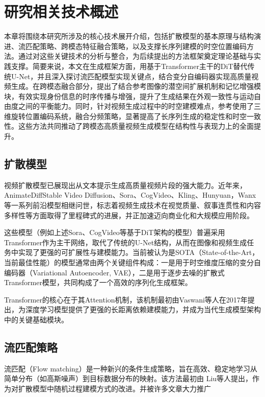 \cleardoublepage
\section{研究相关技术概述}
本章将围绕本研究所涉及的核心技术展开介绍，包括扩散模型的基本原理与结构演进、流匹配策略、跨模态特征融合策略，以及支撑长序列建模的时空位置编码方法。通过对这些关键技术的分析与整合，为后续提出的方法框架奠定理论基础与实践支撑。简要来说，本文在生成框架方面，用基于Transformer主干的DiT替代传统U-Net，并且深入探讨流匹配模型实现关键点，结合变分自编码器实现高质量视频生成。在跨模态融合部分，提出了结合参考图像的潜空间扩展机制和记忆增强模块，有效实现身份信息的时序传播与增强，提升了生成结果在外观一致性与运动自由度之间的平衡能力。同时，针对视频生成过程中的时空建模难点，参考使用了三维旋转位置编码系统，融合分频策略，显著提高了长序列生成的稳定性和时空一致性。这些方法共同推动了跨模态高质量视频生成模型在结构性与表现力上的全面提升。

\subsection{扩散模型}
视频扩散模型已展现出从文本提示生成高质量视频片段的强大能力。近年来，AnimateDiff\cite{guo2023animatediff}Stable Video Diffusion\cite{blattmann2023stable}、Sora\cite{liu2024sora}、CogVideo\cite{yang2024cogvideox}、Kling\cite{kuaishou2024klingai}、Hunyuan\cite{sun2024hunyuan}，Wanx\cite{wan2025}等一系列前沿模型相继问世，标志着视频生成技术在视觉质量、叙事连贯性和内容多样性等方面取得了里程碑式的进展，并正加速迈向商业化和大规模应用阶段。

这些模型（例如上述Sora、CogVideo等基于DiT架构的模型）普遍采用Transformer作为主干网络，取代了传统的U-Net结构，从而在图像和视频生成任务中实现了更强的可扩展性与建模能力。当前被认为是SOTA（State-of-the-Art，当前最佳性能）的模型通常由两个关键组件构成：一是用于时空维度压缩的变分自编码器（Variational Autoencoder, VAE）\cite{pinheiro2021variational}，二是用于逐步去噪的扩散式Transformer模型\cite{han2022survey}，共同构成了一个高效的序列化生成框架。

Transformer的核心在于其Attention机制，该机制最初由Vaswani等人在2017年提出\cite{zhang2024attention}，为深度学习模型提供了更强的长距离依赖建模能力，并成为当代生成模型架构中的关键基础模块。
\subsection{流匹配策略}

流匹配（Flow matching）是一种新兴的条件生成策略，旨在高效、稳定地学习从简单分布（如高斯噪声）到目标数据分布的映射。该方法最初由 Liu\cite{liu2022rectified}等人提出，作为对扩散模型中随机过程建模方式的改进。并被许多文章\cite{lipman2022flow}大力推广

